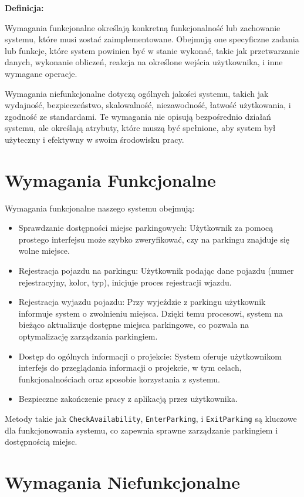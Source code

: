 \noindent \textbf{Definicja:}

Wymagania funkcjonalne określają konkretną funkcjonalność lub zachowanie systemu, które musi zostać zaimplementowane. Obejmują one specyficzne zadania lub funkcje, które system powinien być w stanie wykonać, takie jak przetwarzanie danych, wykonanie obliczeń, reakcja na określone wejścia użytkownika, i inne wymagane operacje.

Wymagania niefunkcjonalne dotyczą ogólnych jakości systemu, takich jak wydajność, bezpieczeństwo, skalowalność, niezawodność, łatwość użytkowania, i zgodność ze standardami. Te wymagania nie opisują bezpośrednio działań systemu, ale określają atrybuty, które muszą być spełnione, aby system był użyteczny i efektywny w swoim środowisku pracy.

\section{Wymagania Funkcjonalne}

Wymagania funkcjonalne naszego systemu obejmują:

\begin{itemize}
    \item Sprawdzanie dostępności miejsc parkingowych: Użytkownik za pomocą prostego interfejsu może szybko zweryfikować, czy na parkingu znajduje się wolne miejsce.
    \item Rejestracja pojazdu na parkingu: Użytkownik podając dane pojazdu (numer rejestracyjny, kolor, typ), inicjuje proces rejestracji wjazdu. 
    \item Rejestracja wyjazdu pojazdu: Przy wyjeździe z parkingu użytkownik informuje system o zwolnieniu miejsca. Dzięki temu procesowi, system na bieżąco aktualizuje dostępne miejsca parkingowe, co pozwala na optymalizację zarządzania parkingiem.
    \item Dostęp do ogólnych informacji o projekcie: System oferuje użytkownikom interfejs do przeglądania informacji o projekcie, w tym celach, funkcjonalnościach oraz sposobie korzystania z systemu.
    \item Bezpieczne zakończenie pracy z aplikacją przez użytkownika.
\end{itemize}

Metody takie jak \texttt{CheckAvailability}, \texttt{EnterParking}, i \texttt{ExitParking} są kluczowe dla funkcjonowania systemu, co zapewnia sprawne zarządzanie parkingiem i dostępnością miejsc.

\section{Wymagania Niefunkcjonalne}

